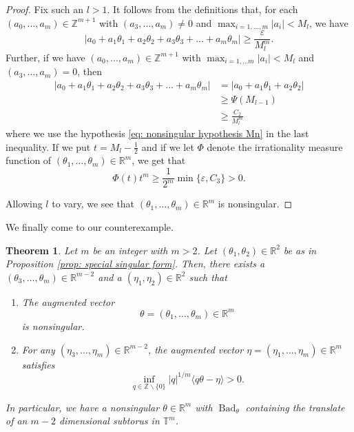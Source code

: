 \documentclass[reqno,11pt, twoside]{amsart}
\theoremstyle{plain}
\newtheorem{thm}{Theorem}[section]
\theoremstyle{definition}
\theoremstyle{definition}
\theoremstyle{remark}
\numberwithin{equation}{section}
\newcommand{\R}{{\mathbb{R}}}
\newcommand{\T}{{\mathbb{T}}}
\newcommand{\Z}{{\mathbb{Z}}}
\newcommand\on[1]{\operatorname{#1}}
\begin{document}
\begin{proof}
Fix such an $l > 1$. It follows from the definitions that, for each $(a_0, \dots, a_m) \in \Z^{m+1}$ with $(a_3, \dots, a_m) \neq 0$ and $\max_{i =1,\dots, m} |a_i| < M_l$, we have
\begin{equation*}
    |a_0 + a_1 \theta_1 + a_2 \theta_2 + a_3 \theta_3 + \dots + a_m \theta_m| \geq \frac{\varepsilon}{M_l^m}.
\end{equation*}
Further, if we have $(a_0, \dots, a_m) \in \Z^{m+1}$ with $\max_{i=1,\dots m} |a_i| < M_l$ and $(a_3, \dots, a_m) = 0$, then 
\begin{equation*}
\begin{split}
    |a_0 + a_1 \theta_1 + a_2 \theta_2 + a_3 \theta_3 + \dots + a_m \theta_m| &= |a_0 + a_1\theta_1 + a_2 \theta_2| \\
    &\geq \Psi(M_{l-1}) \\
    &\geq \frac{C_2}{M_l^m}
\end{split}
\end{equation*}
where we use the hypothesis \eqref{eq: nonsingular hypothesis Mn} in the last inequality.
If we put $t = M_l - \frac{1}{2}$ and if we let $\Phi$ denote the irrationality measure function of $(\theta_1, \dots, \theta_m) \in \R^m$, we get that
\begin{equation*}
    \Phi(t)t^m \geq \frac{1}{2^m} \min\{\varepsilon, C_3\} >0.
\end{equation*}

Allowing $l$ to vary, we see that $(\theta_1, \dots, \theta_m) \in \R^m$ is nonsingular.
\end{proof}
We finally come to our counterexample.
\begin{thm}\label{thm: counterexample}
    Let $m$ be an integer with $m>2$. Let $(\theta_1, \theta_2) \in \R^2$ be as in Proposition \ref{prop: special singular form}. 
    Then, there exists a $(\theta_3, \dots, \theta_m) \in \R^{m-2}$ and a $(\eta_1, \eta_2) \in \R^2$ such that
    \begin{enumerate}
        \item[(a)] The augmented vector 
        \begin{equation*}
        \theta = (\theta_1, \dots, \theta_m) \in \R^m
    \end{equation*}
    is nonsingular.
    \item[(b)] For any $(\eta_3, \dots, \eta_m) \in \R^{m-2}$, the augmented vector $\eta = (\eta_1, \dots, \eta_m) \in \R^m$ satisfies
    \begin{equation*}
        \inf_{q \in \Z \smallsetminus \{0\}} |q|^{1/m} \langle q\theta - \eta \rangle > 0.
    \end{equation*}
    \end{enumerate}
     In particular, we have a nonsingular $\theta \in \R^m$ with $\on{Bad}_\theta$ containing the translate of an $m-2$ dimensional subtorus in $\T^m$.
\end{thm}
\end{document}
